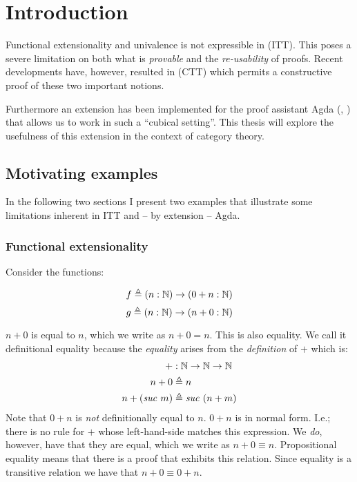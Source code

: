 \chapter{Introduction}
Functional extensionality and univalence is not expressible in
 (ITT). This poses a severe limitation
on both what is \emph{provable} and the \emph{re-usability} of proofs. Recent
developments have, however, resulted in  (CTT) which
permits a constructive proof of these two important notions.

Furthermore an extension has been implemented for the proof assistant Agda
(\cite{agda}, \cite{cubical-agda}) that allows us to work in such a ``cubical
setting''. This thesis will explore the usefulness of this extension in the
context of category theory.
%
\section{Motivating examples}
%
In the following two sections I present two examples that illustrate some
limitations inherent in ITT and -- by extension -- Agda.
%
\subsection{Functional extensionality}
\label{sec:functional-extensionality}
Consider the functions:
%
\begin{multicols}{2}
  \noindent
  \begin{equation*}
    f \mathrel{\triangleq} (n \mathrel{:} \mathbb{N}) \rightarrow (0 + n \mathrel{:} \mathbb{N})
  \end{equation*}
  \begin{equation*}
    g \mathrel{\triangleq} (n \mathrel{:} \mathbb{N}) \rightarrow (n + 0 \mathrel{:} \mathbb{N})
  \end{equation*}
\end{multicols}
%
$n + 0$ is  equal to $n$, which we write as $n + 0 = n$.
This is also \called {} equality. We call it definitional
equality because the \emph{equality} arises from the \emph{definition} of $+$
which is:
%
\newcommand{\suc}[1]{\mathit{suc}\ #1}
\begin{align*}
  +           & \tp \bN \to \bN \to \bN      \\
  n + 0       & \defeq n                   \\
  n + (\suc{m}) & \defeq \suc{(n + m)}
\end{align*}
%
Note that $0 + n$ is \emph{not} definitionally equal to $n$. $0 + n$ is in
normal form. I.e.; there is no rule for $+$ whose left-hand-side matches this
expression. We \emph{do}, however, have that they are 
equal, which we write as $n + 0 \equiv n$. Propositional equality means that
there is a proof that exhibits this relation. Since equality is a transitive
relation we have that $n + 0 \equiv 0 + n$.

